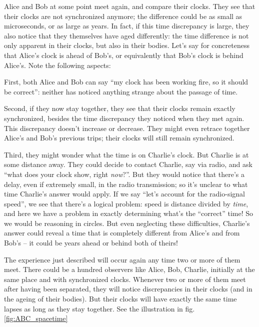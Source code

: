 \documentclass[a4paper,12pt,%
onecolumn,oneside,titlepage,%
british%
]{memoir}
\renewcommand*{\|}[1][]{\nonscript\:#1\vert\nonscript\:\mathopen{}}
\newcommand*{\fig}{fig.}%
\begin{document}
Alice and Bob at some point meet again, and compare their clocks. They see that their clocks are not synchronized anymore; the difference could be as small as microseconds, or as large as years. In fact, if this time discrepancy is large, they also notice that they themselves have aged differently: the time difference is not only apparent in their clocks, but also in their bodies. Let's say for concreteness that Alice's clock is ahead of Bob's, or equivalently that Bob's clock is behind Alice's. Note the following aspects:

First, both Alice and Bob can say \enquote{my clock has been working fire, so it should be correct}: neither has noticed anything strange about the passage of time.

Second, if they now stay together, they see that their clocks remain exactly synchronized, besides the time discrepancy they noticed when they met again. This discrepancy doesn't increase or decrease. They might even retrace together Alice's and Bob's previous trips; their clocks will still remain synchronized.

Third, they might wonder what the time is on Charlie's clock. But Charlie is at some distance away. They could decide to contact Charlie, say via radio, and ask \enquote{what does your clock show, right \emph{now}?}. But they would notice that there's a delay, even if extremely small, in the radio transmission; so it's unclear to what time Charlie's answer would apply. If we say \enquote{let's account for the radio-signal speed}, we see that there's a logical problem: speed is distance divided by \emph{time}, and here we have a problem in exactly determining what's the \enquote{correct} time! So we would be reasoning in circles. But even neglecting these difficulties, Charlie's answer could reveal a time that is completely different from Alice's and from Bob's -- it could be years ahead or behind both of theirs!

The experience just described will occur again any time two or more of them meet. There could be a hundred observers like Alice, Bob, Charlie, initially at the same place and with synchronized clocks. Whenever two or more of them meet after having been separated, they will notice discrepancies in their clocks (and in the ageing of their bodies). But their clocks will have exactly the same time lapses as long as they stay together. See the illustration in \fig\,\ref{fig:ABC_spacetime}
\end{document}
